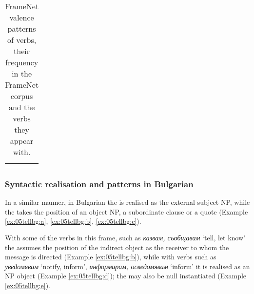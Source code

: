 \documentclass[output=paper,colorlinks,citecolor=brown]{langscibook}
\begin{document}
\begin{table}
\begin{tabularx}{\textwidth}{ lrQ }


\lspbottomrule
\end{tabularx}
    \caption{FrameNet valence patterns of  verbs, their frequency in the FrameNet corpus and the verbs they appear with.}
    \label{tbl:telling-valence}
\end{table} 



\subsubsection{Syntactic realisation and patterns in Bulgarian}
\largerpage
In a similar manner, in Bulgarian the  is realised as the external subject NP, while the  takes the position of an object NP, a subordinate clause or a quote (Example \ref{ex:05tellbg:a}, \ref{ex:05tellbg:b}, \ref{ex:05tellbg:c}). 

With some of the verbs in this frame, such as \textit{казвам, съобщавам} `tell, let know' the  assumes the position of the indirect object as the receiver to whom the message is directed (Example \ref{ex:05tellbg:b}), while with verbs such as \textit{уведомявам} `notify, inform', \textit{информирам, осведомявам} `inform' it is realised as an NP object (Example \ref{ex:05tellbg:d}); the  may also be null instantiated %
(Example \ref{ex:05tellbg:e}). 
\end{document}
